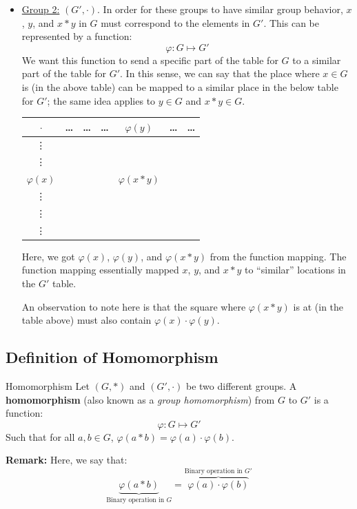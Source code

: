 \documentclass[letterpaper]{article}
\begin{document}
\begin{itemize}
    \item \underline{Group 2:} $(G', \cdot)$. In order for these groups to have similar group behavior, $x$, $y$, and $x * y$ in $G$ must correspond to the elements in $G'$. This can be represented by a function: 
    \[\varphi: G \mapsto G'\]
    We want this function to send a specific part of the table for $G$ to a similar part of the table for $G'$. In this sense, we can say that the place where $x \in G$ is (in the above table) can be mapped to a similar place in the below table for $G'$; the same idea applies to $y \in G$ and $x * y \in G$.  
    \begin{center}
        \begin{tabular}{|c|c c c|c|c c|}
            \hline 
            $\cdot$   & \dots & \dots & \dots & $\varphi(y)$      & \dots & \dots \\ 
            \hline 
            \vdots    &       &       &       &                &       &        \\ 
            \vdots    &       &       &       &                &       &        \\ 
            \hline 
            $\varphi(x)$ &       &       &       & $\varphi(x * y)$  &       &        \\ 
            \hline 
            \vdots    &       &       &       &                &       &        \\ 
            \vdots    &       &       &       &                &       &        \\ 
            \vdots    &       &       &       &                &       &        \\ 
            \hline 
        \end{tabular}
    \end{center}
    Here, we got $\varphi(x)$, $\varphi(y)$, and $\varphi(x * y)$ from the function mapping. The function mapping essentially mapped $x$, $y$, and $x * y$ to ``similar'' locations in the $G'$ table. 

    \bigskip 

    An observation to note here is that the square where $\varphi(x * y)$ is at (in the table above) must also contain $\varphi(x) \cdot \varphi(y)$. 
\end{itemize}




\subsection{Definition of Homomorphism}
\begin{definition}{Homomorphism}{}
    Let $(G, *)$ and $(G', \cdot)$ be two different groups. A \textbf{homomorphism} (also known as a \emph{group homomorphism}) from $G$ to $G'$ is a function: 
    \[\varphi: G \mapsto G'\]
    Such that for all $a, b \in G$, $\varphi(a * b) = \varphi(a) \cdot \varphi(b)$. 
\end{definition}
\textbf{Remark:} Here, we say that: 
\[\underbrace{\varphi(a * b)}_{\text{Binary operation in } G} = \overbrace{\varphi(a) \cdot \varphi(b)}^{\text{Binary operation in } G'}\]
\end{document}
